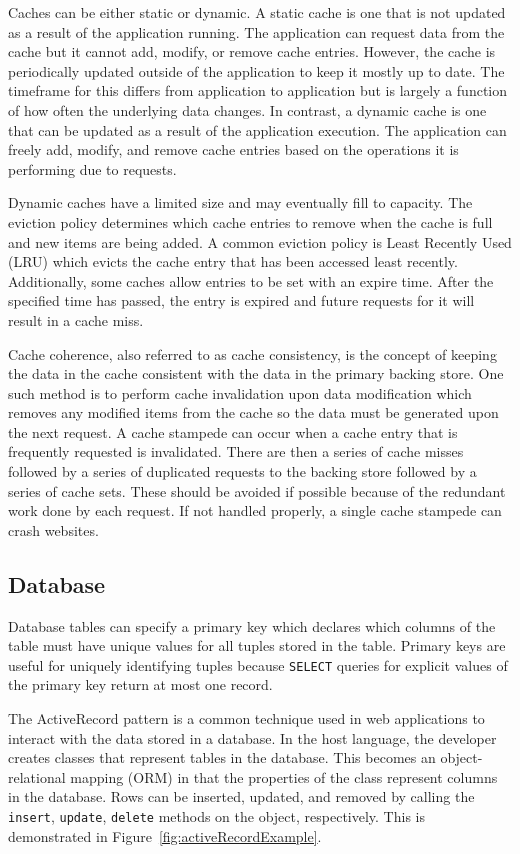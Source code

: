 \documentclass[12pt]{ucthesis}
\begin{document}
Caches can be either static or dynamic.
A static cache is one that is not updated as a result of the application running.
The application can request data from the cache but it cannot add, modify, or remove cache entries.
However, the cache is periodically updated outside of the application to keep it mostly up to date.
The timeframe for this differs from application to application but is largely a function of how often the underlying data changes.
In contrast, a dynamic cache is one that can be updated as a result of the application execution.
The application can freely add, modify, and remove cache entries based on the operations it is performing due to requests.

Dynamic caches have a limited size and may eventually fill to capacity.
The eviction policy determines which cache entries to remove when the cache is full and new items are being added.
A common eviction policy is Least Recently Used (LRU) which evicts the cache entry that has been accessed least recently.
Additionally, some caches allow entries to be set with an expire time.
After the specified time has passed, the entry is expired and future requests for it will result in a cache miss.

Cache coherence, also referred to as cache consistency, is the concept of keeping the data in the cache consistent with the data in the primary backing store.
One such method is to perform cache invalidation upon data modification which removes any modified items from the cache so the data must be generated upon the next request.
A cache stampede can occur when a cache entry that is frequently requested is invalidated.
There are then a series of cache misses followed by a series of duplicated requests to the backing store followed by a series of cache sets.
These should be avoided if possible because of the redundant work done by each request.
If not handled properly, a single cache stampede can crash websites.

\subsection{Database}
Database tables can specify a primary key which declares which columns of the table must have unique values for all tuples stored in the table.
Primary keys are useful for uniquely identifying tuples because {\tt SELECT} queries for explicit values of the primary key return at most one record.

The ActiveRecord pattern is a common technique used in web applications to interact with the data stored in a database.
In the host language, the developer creates classes that represent tables in the database.
This becomes an object-relational mapping (ORM) in that the properties of the class represent columns in the database.
Rows can be inserted, updated, and removed by calling the {\tt insert}, {\tt update}, {\tt delete} methods on the object, respectively.
This is demonstrated in Figure~\ref{fig:activeRecordExample}.
\end{document}
